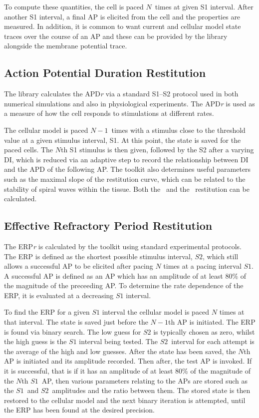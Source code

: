 To compute these quantities, the cell is paced $N$\ times at given S1 interval.
After another S1 interval, a final AP is elicited from the cell and the
properties are measured.  In addition, it is common to want current and
cellular model state traces over the course of an AP and these can be provided
by the library alongside the membrane potential trace.

\subsection{Action Potential Duration Restitution}

The library calculates the APD\emph{r} via a standard S1--S2 protocol used in both
numerical simulations and also in physiological experiments.  The APD\emph{r} is used
as a measure of how the cell responds to stimulations at different rates.

The cellular model is paced $N-1$\ times with a stimulus close to the threshold
value at a given stimulus interval, S1.  At this point, the state is saved for the
paced cells.  The $N$th S1 stimulus is then given, followed by the S2 after a
varying DI, which is reduced via an adaptive step to record the relationship
between DI and the APD of the following AP.  The toolkit also determines useful
parameters such as the maximal slope of the restitution curve, which can be
related to the stability of spiral waves within the tissue.  Both the \apdr\ and
the \apdr[50]\ restitution can be calculated.

\subsection{Effective Refractory Period Restitution}

The ERP\emph{r} is calculated by the toolkit using standard experimental protocols.
The ERP is defined as the shortest possible stimulus interval, $S2$, which still
allows a successful AP to be elicited after pacing $N$ times at a pacing
interval $S1$.  A successful AP is defined as an AP which has an amplitude
of at least 80\% of the magnitude of the preceeding AP.  To determine the rate
dependence of the ERP, it is evaluated at a decreasing $S1$ interval.

To find the ERP for a given $S1$ interval the cellular model is paced $N$ times
at that interval. The state is saved just before the $N-1$th AP is initiated.
The ERP is found via binary search.  The low guess for $S2$ is typically chosen
as zero, whilst the high guess is the $S1$ interval being tested.  The $S2$\
interval for each attempt is the average of the high and low guesses.  After the
state has been saved, the $N$th AP is initiated and its amplitude recorded.
Then \ms{S2} after, the test AP is invoked.  If it is successful, that is if it
has an amplitude of at least 80\% of the magnitude of the $N$th $S1$\ AP, then
various parameters relating to the APs are stored such as the $S1$\ and $S2$\
amplitudes and the ratio between them.  The stored state is then restored to the
cellular model and the next binary iteration is attempted, until the ERP has
been found at the desired precision.

